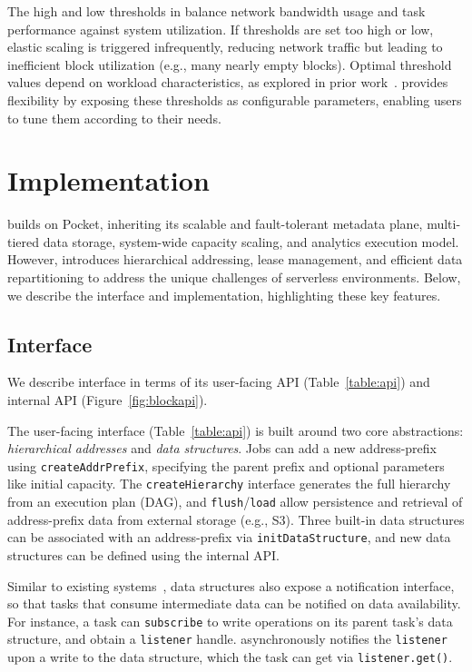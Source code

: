  The high and low thresholds in \jiffy balance network bandwidth usage and task performance against system utilization. If thresholds are set too high or low, elastic scaling is triggered infrequently, reducing network traffic but leading to inefficient block utilization (e.g., many nearly empty blocks). Optimal threshold values depend on workload characteristics, as explored in prior work~\cite{mongo-shard, ceph-shard}. \jiffy provides flexibility by exposing these thresholds as configurable parameters, enabling users to tune them according to their needs.

\section{\jiffy Implementation}
\label{sec:jiffyimplementation}

\jiffy builds on Pocket, inheriting its scalable and fault-tolerant metadata plane, multi-tiered data storage, system-wide capacity scaling, and analytics execution model. However, \jiffy introduces hierarchical addressing, lease management, and efficient data repartitioning to address the unique challenges of serverless environments. Below, we describe the \jiffy interface and implementation, highlighting these key features.

\subsection{\jiffy Interface}
\label{ssec:jiffyapi}


We describe \jiffy interface in terms of its user-facing API (Table~\ref{table:api}) and internal API (Figure~\ref{fig:blockapi}).

 The user-facing interface (Table~\ref{table:api}) is built around two core abstractions: \textit{hierarchical addresses} and \textit{data structures}. Jobs can add a new address-prefix using \texttt{createAddrPrefix}, specifying the parent prefix and optional parameters like initial capacity. The \texttt{createHierarchy} interface generates the full hierarchy from an execution plan (DAG), and \texttt{flush}/\texttt{load} allow persistence and retrieval of address-prefix data from external storage (e.g., S3). Three built-in data structures can be associated with an address-prefix via \texttt{initDataStructure}, and new data structures can be defined using the internal API.

Similar to existing systems~\cite{redis, sns}, data structures also expose a notification interface, so that tasks that consume intermediate data can be notified on data availability. For instance, a task can \texttt{subscribe} to write operations on its parent task's data structure, and obtain a \texttt{listener} handle. \jiffy asynchronously notifies the \texttt{listener} upon a write to the data structure, which the task can get via \texttt{listener.get()}.

